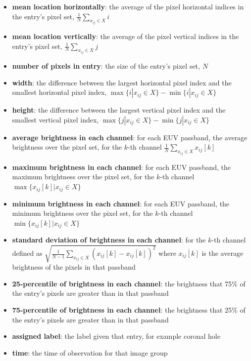 \documentclass[twoside]{report}
\begin{document}
\begin{itemize}
\item \textbf{mean location horizontally}: the average of the pixel horizontal indices in the entry's pixel set, $\frac{1}{N} \sum_{x_{ij} \in X} i$
\item \textbf{mean location vertically}: the average of the pixel vertical indices in the entry's pixel set, $\frac{1}{N} \sum_{x_{ij} \in X} j$
\item \textbf{number of pixels in entry}: the size of the entry's pixel set, $N$
\item \textbf{width}: the difference between the largest horizontal pixel index and the smallest horizontal pixel index, $\max \{i | x_{ij} \in X\} - \min\{i | x_{ij} \in X\}$
\item \textbf{height}: the difference between the largest vertical pixel index and the smallest vertical pixel index,  $\max \{j | x_{ij} \in X\} - \min\{j | x_{ij} \in X\}$
\item \textbf{average brightness in each channel}: for each EUV passband, the average brightness over the pixel set, for the $k$-th channel $\frac{1}{N} \sum_{x_{ij} \in X} x_{ij}[k]$
\item \textbf{maximum brightness in each channel}: for each EUV passband, the maximum brightness over the pixel set, for the $k$-th channel $\max \{x_{ij}[k] | x_{ij} \in X\}$
\item \textbf{minimum brightness in each channel}: for each EUV passband, the minimum brightness over the pixel set, for the $k$-th channel $\min \{x_{ij}[k] | x_{ij} \in X\}$
\item \textbf{standard deviation of brightness in each channel}: for the $k$-th channel defined as $\sqrt{\frac{1}{N-1} \sum_{x_{ij} \in X} \left(x_{ij}[k] - \overline{x_{ij}[k]} \right)^2 }$ where $\overline{x_{ij}[k]}$ is the average brightness of the pixels in that passband
\item \textbf{25-percentile of brightness in each channel}: the brightness that 75\% of the entry's pixels are greater than in that passband
\item \textbf{75-percentile of brightness in each channel}: the brightness that 25\% of the entry's pixels are greater than in that passband
\item \textbf{assigned label}: the label given that entry, for example coronal hole
\item \textbf{time}: the time of observation for that image group
\end{itemize}
\end{document}
